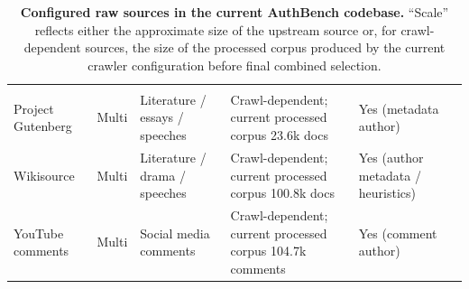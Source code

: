\documentclass{article}
\begin{document}
\begin{table}[h!]
\begin{tabularx}{\textwidth}{@{}l l l l l X@{}}
\citep{stackexchange_data_dump_timeline_2025} \\
{\color{red}Project Gutenberg} & {\color{red}Multi} & {\color{red}Literature / essays / speeches} & {\color{red}Crawl-dependent; current processed corpus 23.6k docs} & {\color{red}Yes (metadata author)} &
\citep{project_gutenberg_offline_catalogs} \\
{\color{red}Wikisource} & {\color{red}Multi} & {\color{red}Literature / drama / speeches} & {\color{red}Crawl-dependent; current processed corpus 100.8k docs} & {\color{red}Yes (author metadata / heuristics)} &
\citep{wikimedia_wikisource_dumps} \\
{\color{red}YouTube comments} & {\color{red}Multi} & {\color{red}Social media comments} & {\color{red}Crawl-dependent; current processed corpus 104.7k comments} & {\color{red}Yes (comment author)} &
\citep{youtube_data_api_v3_docs} \\
\bottomrule
\end{tabularx}
\caption{\textbf{Configured raw sources in the current AuthBench codebase.} ``Scale'' reflects either the approximate size of the upstream source or, for crawl-dependent sources, the size of the processed corpus produced by the current crawler configuration before final combined selection.}
\label{tab:raw-sources}
\end{table}
\end{document}
